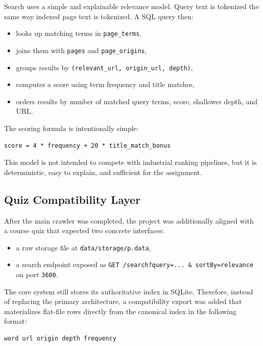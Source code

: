 \documentclass[pdftex,12pt,a4paper]{article}
\begin{document}
Search uses a simple and explainable relevance model. Query text is tokenized the same way indexed page text is tokenized. A SQL query then:

\begin{itemize}
    \item looks up matching terms in \texttt{page\_terms},
    \item joins them with \texttt{pages} and \texttt{page\_origins},
    \item groups results by \texttt{(relevant\_url, origin\_url, depth)},
    \item computes a score using term frequency and title matches,
    \item orders results by number of matched query terms, score, shallower depth, and URL.
\end{itemize}

The scoring formula is intentionally simple:

\begin{Verbatim}[fontsize=\small]
score = 4 * frequency + 20 * title_match_bonus
\end{Verbatim}

This model is not intended to compete with industrial ranking pipelines, but it is deterministic, easy to explain, and sufficient for the assignment.

\subsection{Quiz Compatibility Layer}

After the main crawler was completed, the project was additionally aligned with a course quiz that expected two concrete interfaces:

\begin{itemize}
    \item a raw storage file at \texttt{data/storage/p.data},
    \item a search endpoint exposed as \texttt{GET /search?query=... \& sortBy=relevance} on port \texttt{3600}.
\end{itemize}

The core system still stores its authoritative index in SQLite. Therefore, instead of replacing the primary architecture, a compatibility export was added that materializes flat-file rows directly from the canonical index in the following format:

\begin{Verbatim}[fontsize=\small]
word url origin depth frequency
\end{Verbatim}
\end{document}
